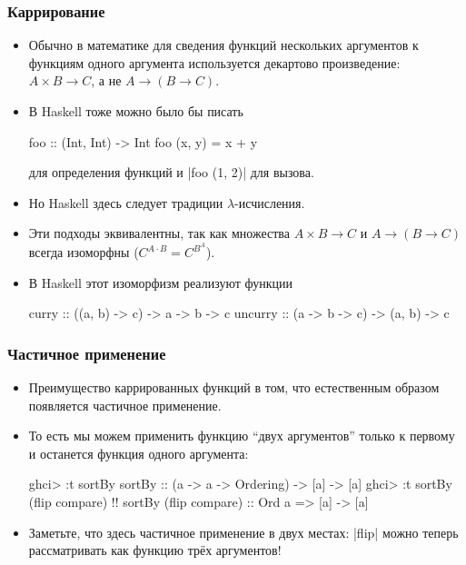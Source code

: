 \documentclass[10pt]{beamer}
\begin{document}
\begin{frame}[fragile]
  \frametitle{Каррирование}
  \begin{itemize}
    \item Обычно в математике для сведения функций нескольких аргументов к функциям одного аргумента используется декартово произведение: $A \times B \to C$, а не $A \to (B \to C)$.\pause
    \item В Haskell тоже можно было бы писать
          \begin{haskell}
            foo :: (Int, Int) -> Int
            foo (x, y) = x + y
          \end{haskell}
          для определения функций и \haskinline|foo (1, 2)| для вызова.\pause
    \item Но Haskell здесь следует традиции $\lambda$-исчисления.\pause
    \item Эти подходы эквивалентны, так как множества $A \times B \to C$ и $A \to (B \to C)$ всегда изоморфны \pause ($C^{A \cdot B} = C^{B^A}$).
    \item В Haskell этот изоморфизм реализуют функции\pause
          \begin{haskell}
            curry :: ((a, b) -> c) -> a -> b -> c
            uncurry :: (a -> b -> c) -> (a, b) -> c
          \end{haskell}
  \end{itemize}
\end{frame}

\begin{frame}[fragile]
  \frametitle{Частичное применение}
  \begin{itemize}
    \item Преимущество каррированных функций в том, что естественным образом появляется частичное применение.
    \item То есть мы можем применить функцию \enquote{двух аргументов} только к первому и останется функция одного аргумента:
          \begin{haskell}
            ghci> :t sortBy
            sortBy :: (a -> a -> Ordering) -> [a] -> [a]
            ghci> :t sortBy (flip compare) !\pause!
            sortBy (flip compare) :: Ord a => [a] -> [a]
          \end{haskell}
          \pause
    \item Заметьте, что здесь частичное применение в двух местах: \pause\haskinline|flip| можно теперь рассматривать как функцию трёх аргументов!
  \end{itemize}
\end{frame}
\end{document}
